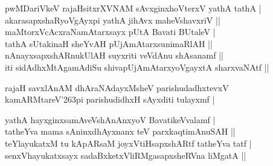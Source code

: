 \begin{entry}
\begin{shl}
pwMDariVkeV rajaHsitxrXVNAM sAvxginxhoVterxV yathA tathA |\\
akarasapxshaRyoVgAyxpi yathA jihAvx maheVshavxriV ||\\
maMtorxVcAcxraNamAtarxsayx pUtA Bavati BUtaleV |\\
tathA sUtakinaH sheYvAH pUjAmAtarxsunimaRlAH ||\\
nAnayxsapxshARnukUlAH suyxriti veVdAnu shAsanamf ||\\
iti sidAdhxMtAgamAdiSu shivapUjAmAtarxyoVgayxtA sharxvaNAtf ||
\end{shl}
\begin{shl}
rajaH savxlAnAM dhAraNAdayxMsheV parishudadhxtevxV kamARMtareV{\char'263}pi parishudidhxH sAyxditi tulayxmf | 
\end{shl}
\begin{shl}
yathA hayxginxsamAveVshAnAnxyoV BavatikeVvalamf |\\
tatheYva mama sAninxdhAyxnanx teV parxkaqtimAnuSAH ||\\
teYlayukatxM tu kApARsaM joyxVtiHsapxshARtf tatheYva tatf |\\
senxVhayukatxsayx sadaBxketxVliRMgasapxsheRVna liMgatA ||
\end{shl}


\end{entry}
